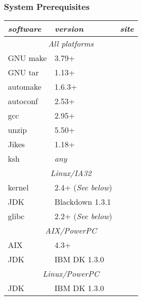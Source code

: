 \subsubsection{System Prerequisites}

\begin{table}[h]
\begin{center}
\begin{tabular}{|l|l|l|} \hline\hline
{\em software} & {\em version} & {\em site} \\ \hline
\multicolumn{3}{|c|}{\em All platforms}                     \\ \hline
GNU make       & 3.79+    & \xlink{\tt \makeURL}{\makeURL}         \\ 
GNU tar        & 1.13+    & \xlink{\tt \tarURL}{\tarURL}           \\ 
automake       & 1.6.3+   & \xlink{\tt \automakeURL}{\automakeURL} \\
autoconf       & 2.53+    & \xlink{\tt \autoconfURL}{\autoconfURL} \\
gcc            & 2.95+    & \xlink{\tt \gccURL}{\gccURL}           \\
unzip          & 5.50+    & \xlink{\tt \unzipURL}{\unzipURL}       \\
Jikes          & 1.18+    & \xlink{\tt \jikesURL}{\jikesURL}       \\
ksh            & {\em any}& \xlink{\tt \kshURL}{\kshURL}	   \\ \hline
\multicolumn{3}{|c|}{\em Linux/IA32}                      \\ \hline
kernel         & 2.4+ ({\em See below}) & \xlink{\tt \linuxKernelURL}{\linuxKernelURL} \\
JDK            & Blackdown 1.3.1 & \xlink{\tt \BlackdownURL}{\BlackdownURL} \\
glibc          & 2.2+ ({\em See below}) & \xlink{\tt \glibcURL}{\glibcURL} \\ \hline
\multicolumn{3}{|c|}{\em AIX/PowerPC}                     \\ \hline
AIX            & 4.3+     &                          \\
JDK            & IBM DK 1.3.0 & \xlink{\tt \AIXJdkURL}{\AIXJdkURL} \\ \hline
\multicolumn{3}{|c|}{\em Linux/PowerPC}                      \\ \hline
JDK            & IBM DK 1.3.0    & \xlink{\tt \linuxPPCJDKURL}{\linuxPPCJDKURL} \\
\hline\hline 
\end{tabular}

\end{center}
\end{table}
